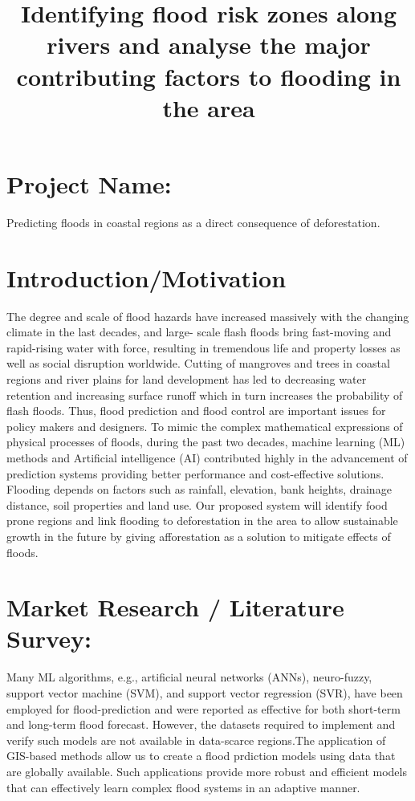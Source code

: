 \documentclass{article}
\title{Identifying flood risk zones along rivers and analyse the major contributing factors to flooding in the area  }
\author{}
\begin{document}
	\maketitle
	\section*{Project Name:}
		Predicting floods in coastal regions as a direct consequence of deforestation.
	\section*{Introduction/Motivation}
		The degree and scale of flood hazards have increased massively with the changing climate in the last decades, and large-		scale flash floods bring fast-moving and rapid-rising water with force, resulting in tremendous life and property losses as well as social disruption worldwide. Cutting of mangroves and trees in coastal regions and river plains for land development has led to decreasing water retention and increasing surface runoff which in turn increases the probability of flash floods. Thus, flood prediction and flood control are important issues for policy makers and designers. To mimic the complex mathematical expressions of physical processes of floods, during the past two decades, machine learning (ML) methods and Artificial intelligence (AI) contributed highly in the advancement of prediction systems providing better performance and cost-effective solutions.
Flooding depends on factors such as rainfall, elevation, bank heights, drainage distance, soil properties and land use. Our proposed system will identify food prone regions and link flooding to deforestation in the area to allow sustainable growth in the future by giving afforestation as a solution to mitigate effects of floods.   
	\section*{Market Research / Literature Survey:}
		Many ML algorithms, e.g., artificial neural networks (ANNs), neuro-fuzzy, support vector machine (SVM), and support vector regression (SVR), have been employed for flood-prediction and were reported as effective for both short-term and long-term flood forecast. However, the datasets required to implement and verify such models are not available in data-scarce regions.The application of GIS-based methods allow us to create a flood prdiction models using data that are globally available. Such applications provide more robust and efficient models that can effectively learn complex flood systems in an adaptive manner. 
\end{document}
